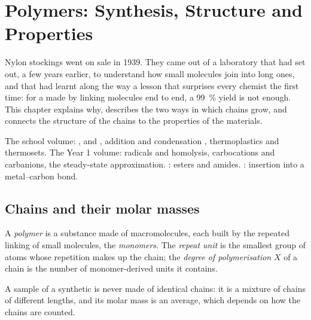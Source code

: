 \chapter{Polymers: Synthesis, Structure and Properties}\label{ch:b2:polymer-synthesis}

Nylon stockings went on sale in 1939. They came out of a laboratory that had set out, a few years
earlier, to understand how small molecules join into long ones, and that had learnt along the way a
lesson that surprises every chemist the first time: for a  made by linking molecules end to end,
a 99~\% yield is not enough. This chapter explains why, describes the two ways in which chains grow,
and connects the structure of the chains to the properties of the materials.

\begin{recall}
The school volume: ,  and , addition and condensation ,
thermoplastics and thermosets. The Year 1 volume: radicals and homolysis, carbocations and
carbanions, the steady-state approximation. : esters and amides.
: insertion into a metal--carbon bond.
\end{recall}

\section{Chains and their molar masses}

\begin{definition}[Polymer]\label{def:b2:polymer-synthesis:polymer}
A \emph{polymer} is a substance made of macromolecules, each built by the repeated
linking of small molecules, the \emph{monomers}. The \emph{repeat unit}
is the smallest group of atoms whose repetition makes up the chain; the \emph{degree of
polymerisation} $X$ of a chain is the number of monomer-derived units
it contains.
\end{definition}

A sample of a synthetic  is never made of identical chains: it is a mixture of chains of
different lengths, and its molar mass is an average, which depends on how the chains are counted.


